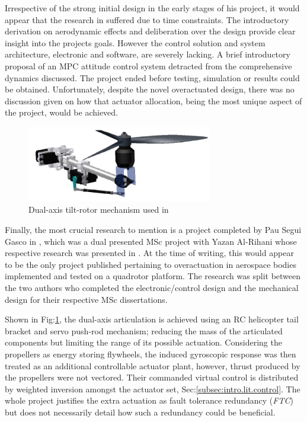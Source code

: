 \par
Irrespective of the strong initial design in the early stages of his project, it would appear that the research in \cite{napsholm} suffered due to time constraints. The introductory derivation on aerodynamic effects and deliberation over the design provide clear insight into the projects goals. However the control solution and system architecture, electronic and software, are severely lacking. A brief introductory proposal of an MPC attitude control system detracted from the comprehensive dynamics discussed. The project ended before testing, simulation or results could be obtained. Unfortunately, despite the novel overactuated design, there was no discussion given on how that actuator allocation, being the most unique aspect of the project, would be achieved.
\par
\begin{figure}[htbp]
\centering
\includegraphics[width=0.72\textwidth]{figs/gasco-mech}
\caption{Dual-axis tilt-rotor mechanism used in \cite{tiltgasco}}
\label{fig:tiltrotor-gasco}
\vspace{-6pt}
\end{figure}
Finally, the most crucial research to mention is a project completed by Pau Segui Gasco in \cite{tiltgasco}, which was a dual presented MSc project with Yazan Al-Rihani whose respective research was presented in \cite{tiltrihani}. At the time of writing, this would appear to be the only project published pertaining to overactuation in aerospace bodies implemented and tested on a quadrotor platform. The research was split between the two authors who completed the electronic/control design and the mechanical design for their respective MSc dissertations. 
\par
Shown in Fig:\ref{fig:tiltrotor-gasco}, the dual-axis articulation is achieved using an RC helicopter tail bracket and servo push-rod mechanism; reducing the mass of the articulated components but limiting the range of its possible actuation. Considering the propellers as energy storing flywheels, the induced gyroscopic response was then treated as an additional controllable actuator plant, however, thrust produced by the propellers were not vectored. Their commanded virtual control is distributed by weighted inversion amongst the actuator set, Sec:\ref{subsec:intro.lit.control}. The whole project justifies the extra actuation as fault tolerance redundancy (\emph{FTC}) but does not necessarily detail how such a redundancy could be beneficial.
